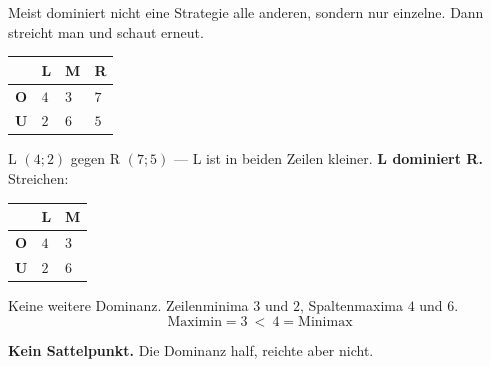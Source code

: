 \begin{merksatz}
Meist dominiert nicht eine Strategie alle anderen, sondern nur einzelne. Dann streicht man und schaut erneut.

\begin{center}
{\small
\renewcommand{\arraystretch}{1.5}
\begin{tabular}{@{}P{1.6cm}P{1.4cm}P{1.4cm}P{1.4cm}@{}}
\toprule
& \textbf{L} & \textbf{M} & \textbf{R}\\
\midrule
\textbf{O} & $4$ & $3$ & $7$\\
\textbf{U} & $2$ & $6$ & $5$\\
\bottomrule
\end{tabular}}
\end{center}

 L $(4;2)$ gegen R $(7;5)$ --- L ist in beiden Zeilen kleiner. \textbf{L dominiert R.} Streichen:

\begin{center}
{\small
\renewcommand{\arraystretch}{1.5}
\begin{tabular}{@{}P{1.6cm}P{1.4cm}P{1.4cm}@{}}
\toprule
& \textbf{L} & \textbf{M}\\
\midrule
\textbf{O} & $4$ & $3$\\
\textbf{U} & $2$ & $6$\\
\bottomrule
\end{tabular}}
\end{center}

 Keine weitere Dominanz. Zeilenminima $3$ und $2$, Spaltenmaxima $4$ und $6$.
\[ \text{Maximin} = 3 \ <\ 4 = \text{Minimax} \]

\begin{center}
\begin{minipage}{0.9\textwidth}
\textbf{Kein Sattelpunkt.} Die Dominanz half, reichte aber nicht.
\end{minipage}
\end{center}

\begin{center}
\begin{minipage}{0.88\textwidth}
\end{minipage}
\end{center}
\end{merksatz}

